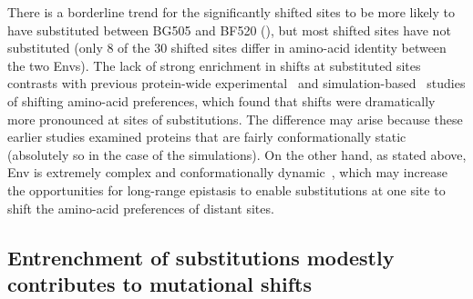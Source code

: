 \documentclass[9pt]{elife}
\begin{document}
There is a borderline trend for the significantly shifted sites to be more likely to have substituted between BG505 and BF520 (), but most shifted sites have not substituted (only 8 of the 30 shifted sites differ in amino-acid identity between the two Envs).
The lack of strong enrichment in shifts at substituted sites contrasts with previous protein-wide experimental~\citep{doud2015site} and simulation-based~\citep{pollock2012amino,shah2015contingency} studies of shifting amino-acid preferences, which found that shifts were dramatically more pronounced at sites of substitutions.
The difference may arise because these earlier studies examined proteins that are fairly conformationally static (absolutely so in the case of the simulations).
On the other hand, as stated above, Env is extremely complex and conformationally dynamic~\citep{munro2014conformational,ozorowski2017open}, which may increase the opportunities for long-range epistasis to enable substitutions at one site to shift the amino-acid preferences of distant sites.

\subsection{Entrenchment of substitutions modestly contributes to mutational shifts}
\end{document}
